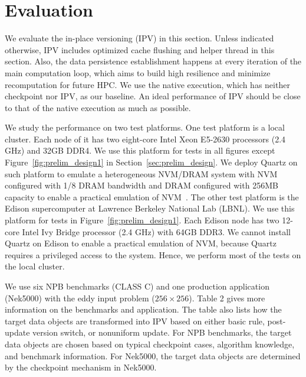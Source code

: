 \section{Evaluation}
\label{sec:eval}

We evaluate the in-place versioning (IPV) in this section.
Unless indicated otherwise, IPV includes optimized cache flushing 
and helper thread in this section.
Also, the data persistence establishment happens at every iteration of the main computation loop, which aims to build
high resilience and minimize recomputation for future HPC.
We use the native execution, which has neither checkpoint
nor IPV, as our baseline. 
An ideal performance of IPV should be close to that of
the native execution as much as possible.

We study the performance on two test platforms. 
One test platform is a local cluster. Each node of it has two eight-core Intel Xeon E5-2630 processors (2.4 GHz) and 32GB DDR4. We use this platform for tests in all figures except Figure~\ref{fig:prelim_design1} in Section~\ref{sec:prelim_design}. %
We deploy Quartz on such platform to emulate a heterogeneous NVM/DRAM system with NVM configured with 1/8 DRAM bandwidth and DRAM configured with 256MB capacity to enable a practical emulation of NVM~\cite{eurosys16:dulloor, NVMDB}. 
The other test platform is the Edison supercomputer at Lawrence Berkeley National Lab (LBNL). We use this platform for tests in Figure~\ref{fig:prelim_design1}. 
Each Edison node has two 12-core Intel Ivy Bridge processor (2.4 GHz) with 64GB DDR3. 
We cannot install Quartz on Edison to enable a practical emulation of NVM, because Quartz requires a privileged access to the system. Hence, we perform most of the tests on the local cluster.

We use six NPB benchmarks (CLASS C) and one production application (Nek5000) with the eddy input problem ($256 \times 256$). %
Table 2 gives more information on the benchmarks and application. The table also lists how the target data objects are transformed into IPV based on either basic rule, post-update version switch, or nonuniform update.
For NPB benchmarks, the target data objects are chosen based on typical checkpoint cases, algorithm knowledge, and benchmark information.
For Nek5000, the target data objects are determined by the checkpoint mechanism in Nek5000. 

